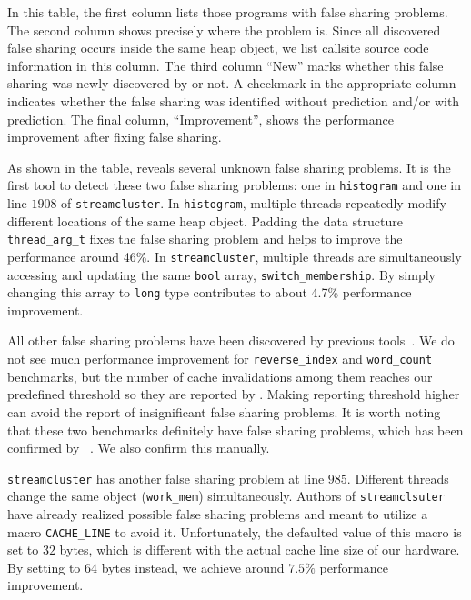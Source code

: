 In this table, the first column lists those programs with false
sharing problems.  The second column shows precisely where the problem
is. Since all discovered false sharing occurs inside the same heap
object, we list callsite source code information in this column.  The
third column ``New'' marks whether this false sharing was newly
discovered by \Predator{} or not.  A checkmark in the appropriate
column indicates whether the false sharing was identified without
prediction and/or with prediction.  The final column, ``Improvement'',
shows the performance improvement after fixing false sharing.

As shown in the table, \Predator{} reveals several unknown false sharing problems. 
It is the first tool to detect these two false sharing problems: one in \texttt{histogram} 
and one in line $1908$ of \texttt{streamcluster}. 
In \texttt{histogram}, multiple threads repeatedly modify different locations of the same heap object. 
Padding the data structure \texttt{thread\_arg\_t} fixes the false sharing problem and 
helps to improve the performance around 46\%.
In \texttt{streamcluster}, multiple threads are simultaneously accessing and updating 
the same \texttt{bool} array, \texttt{switch\_membership}. 
By simply changing this array to \texttt{long} type contributes to about 4.7\% performance improvement.

All other false sharing problems have been discovered by previous tools~\cite{sheriff}.
We do not see much performance improvement for \texttt{reverse\_index} and 
\texttt{word\_count} benchmarks, but the number of cache invalidations 
among them reaches our predefined threshold so they are reported by \predator{}.
Making reporting threshold higher can avoid the report of insignificant false sharing problems.
It is worth noting that these two benchmarks definitely have false sharing problems,
which has been confirmed by \Sheriff~\cite{sheriff}. 
We also confirm this manually. 

\texttt{streamcluster} has another false sharing problem at line $985$. 
Different threads change the same object (\texttt{work\_mem}) simultaneously. 
Authors of \texttt{streamclsuter} have already realized possible
false sharing problems and meant to utilize a macro \texttt{CACHE\_LINE} to avoid it. Unfortunately,
the defaulted value of this macro is set to $32$ bytes, which is different with the actual
cache line size of our hardware. By setting to $64$ bytes instead, we achieve around $7.5\%$ performance
improvement.

